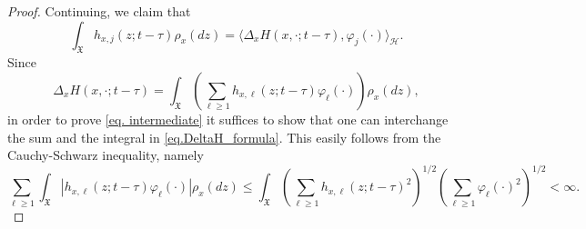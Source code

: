 \documentclass[11pt,reqno]{amsart}
\theoremstyle{remark}
\theoremstyle{definition}
\numberwithin{theorem}{section} \numberwithin{equation}{section}
\newcommand{\X}{\mathfrak{X}}
\begin{document}
\begin{proof}
Continuing, we claim that
\begin{equation}\label{eq. intermediate}
\int_\X  h_{x,j}(z;t-\tau) \rho_x(dz) = \langle \Delta_xH(x,\cdot;t-\tau),\varphi_j(\cdot) \rangle_\mathcal{H}.
\end{equation}
Since
\begin{equation}\label{eq.DeltaH_formula}
\Delta_xH(x,\cdot;t-\tau) = \int_\X \left(\sum_{\ell\geq 1} h_{x,\ell}(z;t-\tau) \varphi_\ell (\cdot)\right) \rho_x(dz),
\end{equation}
in order to prove \eqref{eq. intermediate} it suffices to show that one can interchange the sum and the integral in \eqref{eq.DeltaH_formula}.
This easily follows from the Cauchy-Schwarz inequality, namely
$$
\sum_{\ell\geq 1} \int_\X \left| h_{x,\ell}(z;t-\tau) \varphi_\ell (\cdot) \right| \rho_x(dz)\leq \int_\X \left( \sum_{\ell\geq 1} h_{x,\ell}(z;t-\tau)^2\right)^{1/2}  \left( \sum_{\ell\geq 1} \varphi_\ell(\cdot)^2\right)^{1/2} <\infty.
$$


\end{proof}
\end{document}
